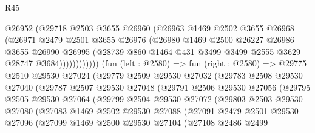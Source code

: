 \begin{lexlean}{R45}
\begin{coremodule}
                      @26952
                      (@29718
                        @2503
                        @3655
                        @26960
                        (@26963
                          @1469
                          @2502
                          @3655
                          @26968
                          (@26971
                            @2479
                            @2501
                            @3655
                            @26976
                            (@26980
                              @1469
                              @2500
                              @26227
                              @26986
                              @3655
                              @26990
                              @26995
                              (@28739
                                @860
                                @1464
                                @431
                                @3499
                                @3499
                                @2555
                                @3629
                                @28747
                                @3684))))))))))))
        (fun (left : @2580) =>
        fun (right : @2580) =>
        @29775
          @2510
          @29530
          @27024
          (@29779
            @2509
            @29530
            @27032
            (@29783
              @2508
              @29530
              @27040
              (@29787
                @2507
                @29530
                @27048
                (@29791
                  @2506
                  @29530
                  @27056
                  (@29795
                    @2505
                    @29530
                    @27064
                    (@29799
                      @2504
                      @29530
                      @27072
                      (@29803
                        @2503
                        @29530
                        @27080
                        (@27083
                          @1469
                          @2502
                          @29530
                          @27088
                          (@27091
                            @2479
                            @2501
                            @29530
                            @27096
                            (@27099
                              @1469
                              @2500
                              @29530
                              @27104
                              (@27108
                                @2486
                                @2499

\end{coremodule}
\end{lexlean}
